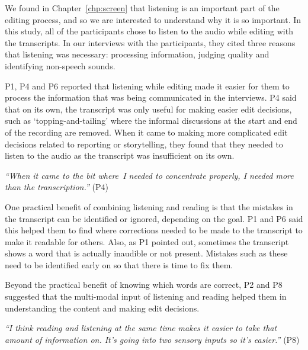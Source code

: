 We found in Chapter~\ref{chp:screen} that listening is an important part of the editing process, and so we are
interested to understand why it is so important. In this study, all of the participants chose to listen to the audio
while editing with the transcripts. In our interviews with the participants, they cited three reasons that listening
was necessary: processing information, judging quality and identifying non-speech sounds.





P1, P4 and P6 reported that listening while editing made it easier for them to process the information that was
being communicated in the interviews.  P4 said that on its own, the transcript was only useful for making easier edit
decisions, such as `topping-and-tailing' where the informal discussions at the start and end of the recording are
removed.  When it came to making more complicated edit decisions related to reporting or storytelling, they found that
they needed to listen to the audio as the transcript was insufficient on its own.

\textit{``When it came to the bit where I needed to concentrate properly, I needed more than the transcription.''} (P4)

One practical benefit of combining listening and reading is that the mistakes in the transcript can be identified or 
ignored, depending on the goal.  P1 and P6 said this helped them to find where corrections needed to be made to the
transcript to make it readable for others. Also, as P1 pointed out, sometimes the transcript shows a word that is
actually inaudible or not present. Mistakes such as these need to be identified early on so that there is time to fix
them.

Beyond the practical benefit of knowing which words are correct, P2 and P8 suggested that the multi-modal input of
listening and reading helped them in understanding the content and making edit decisions.

\textit{``I think reading and listening at the same time makes it easier to take that amount of information on. It's
going into two sensory inputs so it's easier.''} (P8)

